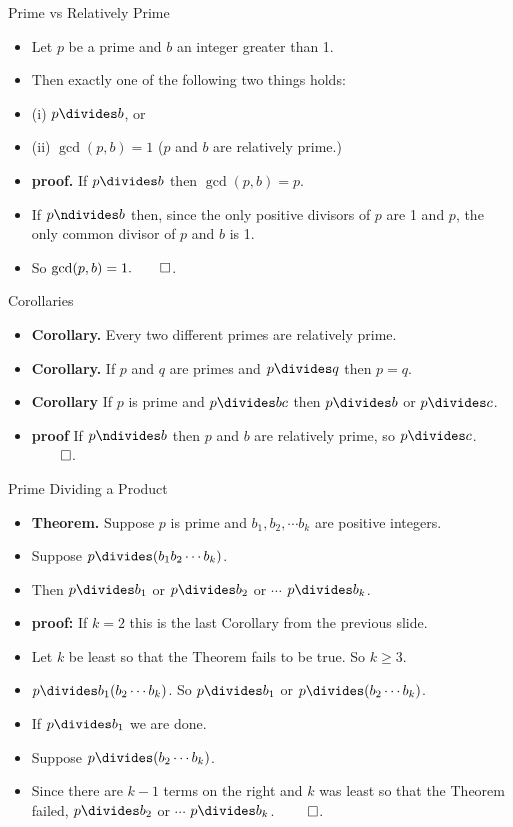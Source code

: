 \documentclass{beamer}
\begin{document}
\begin{frame}{Prime vs Relatively Prime}

\begin{itemize}
  \item Let $p$ be a prime and $b$ an integer greater than 1.
  \item Then exactly one of the following two things holds:
  \item (i) $p \divides b$, or
  \item (ii) $\gcd(p,b) = 1$ ($p$ and $b$ are relatively prime.)
  \item \textbf{proof.} If $p\divides b$ then $\gcd(p,b) = p$.
  \item If $p\ndivides b$
  then, since the only positive divisors of $p$ are 1 and $p$, the only common
  divisor of $p$ and $b$ is 1.
  \item So $\gcd(p,b) = 1. \qed$.
\end{itemize}

\end{frame}

\begin{frame}{Corollaries}

\begin{itemize}
  \item \textbf{Corollary.} Every two different primes are relatively prime.
  \item \textbf{Corollary.} If $p$ and $q$ are primes and $p\divides q$ then $p=q$.
  \item \textbf{Corollary} If $p$ is prime and $p\divides bc$ then $p\divides b$ or $p\divides c$.
  \item \textbf{proof} If $p\ndivides b$ then $p$ and $b$ are relatively prime, so $p\divides c$. $\qed$.
\end{itemize}
\end{frame}

\begin{frame}{Prime Dividing a Product}

\begin{itemize}
  \item \textbf{Theorem.} Suppose $p$ is prime and $b_1,b_2,\cdots b_k$ are positive integers.
  \item Suppose $p \divides (b_1 b_2 \cdots b_k)$.
  \item Then $p \divides b_1$ or $p\divides b_2$ or $\cdots$ $p\divides b_k$.
  \item \textbf{proof:} If $k=2$ this is the last Corollary from the previous slide.
  \item Let $k$ be least so that the Theorem fails to be true. So $k\geq 3$.
  \item $p\divides b_1(b_2\cdots b_k)$. So $p\divides b_1$ or $p\divides (b_2\cdots b_k)$.
  \item If $p\divides b_1$ we are done.
  \item Suppose $p\divides (b_2\cdots b_k)$.
  \item Since there are $k-1$ terms on the right and $k$ was
  least so that the Theorem failed, $p\divides b_2$ or $\cdots$ $p\divides b_k$. $\qed$.
\end{itemize}

\end{frame}
\end{document}
